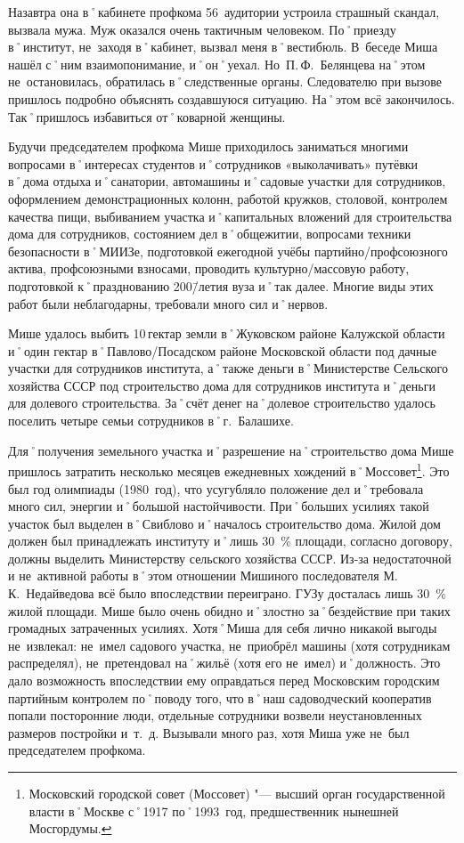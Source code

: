Назавтра она в˚кабинете профкома 56~аудитории устроила страшный скандал, вызвала мужа. Муж оказался очень тактичным человеком. По˚приезду в˚институт, не~заходя в˚кабинет, вызвал меня в˚вестибюль. В~беседе Миша нашёл с˚ним взаимопонимание, и˚он˚уехал. Но~П.\,Ф.~Белянцева на˚этом не~остановилась, обратилась в˚следственные органы. Следователю при вызове пришлось подробно объяснять создавшуюся ситуацию. На˚этом всё закончилось. Так˚пришлось избавиться от˚коварной женщины. 

Будучи председателем профкома Мише приходилось заниматься многими вопросами в˚интересах студентов и˚сотрудников «выколачивать» путёвки в˚дома отдыха и˚санатории, автомашины и˚садовые участки для сотрудников, оформлением демонстрационных колонн, работой кружков, столовой, контролем качества пищи, выбиванием участка и˚капитальных вложений для строительства дома для сотрудников, состоянием дел в˚общежитии, вопросами техники безопасности в˚МИИЗе, подготовкой ежегодной учёбы партийно\-/профсоюзного актива, профсоюзными взносами, проводить культурно\-/массовую работу, подготовкой к˚празднованию 200\=/летия вуза и˚так далее. Многие виды этих работ были неблагодарны, требовали много сил и˚нервов. 

Мише удалось выбить 10\,гектар земли в˚Жуковском районе Калужской области и˚один гектар в˚Павлово\-/Посадском районе Московской области под дачные участки для сотрудников института, а˚также деньги в˚Министерстве Сельского хозяйства СССР под строительство дома для сотрудников института и˚деньги для долевого строительства. За˚счёт денег на˚долевое строительство удалось поселить четыре семьи сотрудников в˚г.~Балашихе.

Для˚получения земельного участка и˚разрешение на˚строительство дома Мише пришлось затратить несколько месяцев ежедневных хождений в˚Моссовет\footnote{Московский городской совет (Моссовет) "--- высший орган государственной власти в˚Москве с˚1917 по˚1993~год, предшественник нынешней Мосгордумы.}. Это был год олимпиады (1980~год), что усугубляло положение дел и˚требовала много сил, энергии и˚большой настойчивости. При˚больших усилиях такой участок был выделен в˚Свиблово и˚началось строительство дома. Жилой дом должен был принадлежать институту и˚лишь 30~\% площади, согласно договору, должны выделить Министерству сельского хозяйства СССР. Из-за недостаточной и не~активной работы в˚этом отношении Мишиного последователя М.\,К.~Недайведова всё было впоследствии переиграно. ГУЗу досталась лишь 30~\% жилой площади. Мише было очень обидно и˚злостно за˚бездействие при таких громадных затраченных усилиях. Хотя˚Миша для себя лично никакой выгоды не~извлекал: не~имел садового участка, не~приобрёл машины (хотя сотрудникам распределял), не~претендовал на˚жильё (хотя его не~имел) и˚должность. Это дало возможность впоследствии ему оправдаться перед Московским городским партийным контролем по˚поводу того, что в˚наш садоводческий кооператив попали посторонние люди, отдельные сотрудники возвели неустановленных размеров постройки и~т.~д. Вызывали много раз, хотя Миша уже не~был председателем профкома.

